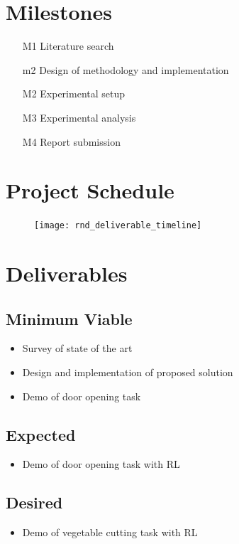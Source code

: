 \documentclass[thesis]{mas_proposal}
\begin{document}
\section{Milestones}
\begin{enumerate}
    \item[M1] Literature search
    \item[m2] Design of methodology and implementation
    \item[M2] Experimental setup
    \item[M3] Experimental analysis
    \item[M4] Report submission
\end{enumerate}

\section{Project Schedule}

\begin{figure}[h!]
    \texttt{[image: rnd\_deliverable\_timeline]}
    \caption{}
    \label{}
\end{figure}

\section{Deliverables}
\subsection{Minimum Viable}

\begin{itemize}
    \item Survey of state of the art
    \item Design and implementation of proposed solution
    \item Demo of door opening task
\end{itemize}

\subsection{Expected}
\begin{itemize}
    \item Demo of door opening task with RL
\end{itemize}

\subsection{Desired}
\begin{itemize}
    \item Demo of vegetable cutting task with RL
\end{itemize}


\nocite{*}

\end{document}
